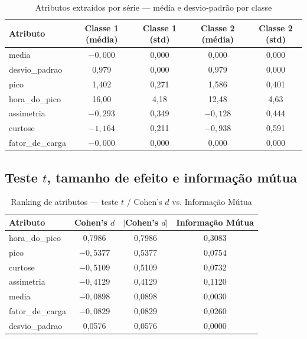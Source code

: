 \documentclass[12pt,a4paper]{article}
\begin{document}
\begin{table}[H]
\centering
\caption{Atributos extraídos por série --- média e desvio-padrão por classe}
\small
\begin{tabular}{lcccc}
\toprule
Atributo & Classe 1 (média) & Classe 1 (std) & Classe 2 (média) & Classe 2 (std) \\
\midrule
media           & $-0{,}000$ & 0{,}000 & 0{,}000  & 0{,}000 \\
desvio\_padrao  & 0{,}979 & 0{,}000 & 0{,}979 & 0{,}000 \\
pico            & 1{,}402 & 0{,}271 & 1{,}586 & 0{,}401 \\
hora\_do\_pico  & 16{,}00 & 4{,}18  & 12{,}48 & 4{,}63 \\
assimetria      & $-0{,}293$ & 0{,}349 & $-0{,}128$ & 0{,}444 \\
curtose         & $-1{,}164$ & 0{,}211 & $-0{,}938$ & 0{,}591 \\
fator\_de\_carga & $-0{,}000$ & 0{,}000 & 0{,}000 & 0{,}000 \\
\bottomrule
\end{tabular}
\end{table}

\subsection{Teste $t$, tamanho de efeito e informação mútua}

\begin{table}[H]
\centering
\caption{Ranking de atributos --- teste $t$ / Cohen's $d$ vs. Informação Mútua}
\begin{tabular}{lccc}
\toprule
Atributo & Cohen's $d$ & $|$Cohen's $d|$ & Informação Mútua \\
\midrule
hora\_do\_pico   & 0{,}7986  & 0{,}7986 & 0{,}3083 \\
pico             & $-0{,}5377$ & 0{,}5377 & 0{,}0754 \\
curtose          & $-0{,}5109$ & 0{,}5109 & 0{,}0732 \\
assimetria       & $-0{,}4129$ & 0{,}4129 & 0{,}1120 \\
media            & $-0{,}0898$ & 0{,}0898 & 0{,}0030 \\
fator\_de\_carga & $-0{,}0829$ & 0{,}0829 & 0{,}0260 \\
desvio\_padrao   & 0{,}0576  & 0{,}0576 & 0{,}0000 \\
\bottomrule
\end{tabular}
\end{table}
\end{document}

